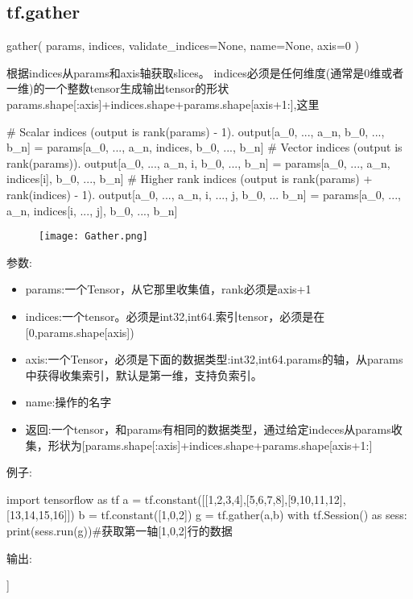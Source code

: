 \subsection{tf.gather}
\begin{python}
gather(
    params,
    indices,
    validate_indices=None,
    name=None,
    axis=0
	)
\end{python}
根据indices从params和axis轴获取slices。
indices必须是任何维度(通常是0维或者一维)的一个整数tensor生成输出tensor的形状params.shape[:axis]+indices.shape+params.shape[axis+1:],这里
\begin{python}
# Scalar indices (output is rank(params) - 1).
output[a_0, ..., a_n, b_0, ..., b_n] =
params[a_0, ..., a_n, indices, b_0, ..., b_n]
# Vector indices (output is rank(params)).
output[a_0, ..., a_n, i, b_0, ..., b_n] =
params[a_0, ..., a_n, indices[i], b_0, ..., b_n]
# Higher rank indices (output is rank(params) + rank(indices) - 1).
output[a_0, ..., a_n, i, ..., j, b_0, ... b_n] =
params[a_0, ..., a_n, indices[i, ..., j], b_0, ..., b_n]
\end{python}
\begin{figure}[H]
	\texttt{[image: Gather.png]}
\end{figure}
参数:
\begin{itemize}
	\item params:一个Tensor，从它那里收集值，rank必须是axis+1
	\item indices:一个tensor。必须是int32,int64.索引tensor，必须是在[0,params.shape[axis])
	\item axis:一个Tensor，必须是下面的数据类型:int32,int64.params的轴，从params中获得收集索引，默认是第一维，支持负索引。
	\item name:操作的名字
	\item{返回}:一个tensor，和params有相同的数据类型，通过给定indeces从params收集，形状为[params.shape[:axis]+indices.shape+params.shape[axis+1:]
\end{itemize}
例子:
\begin{python}
import tensorflow as tf
a = tf.constant([[1,2,3,4],[5,6,7,8],[9,10,11,12],[13,14,15,16]])
b = tf.constant([1,0,2])
g = tf.gather(a,b)
with tf.Session() as sess:
    print(sess.run(g))#获取第一轴[1,0,2]行的数据
\end{python}
输出:
\begin{python}
[[ 5  6  7  8]
 [ 1  2  3  4]
 [ 9 10 11 12]]
\end{python}
